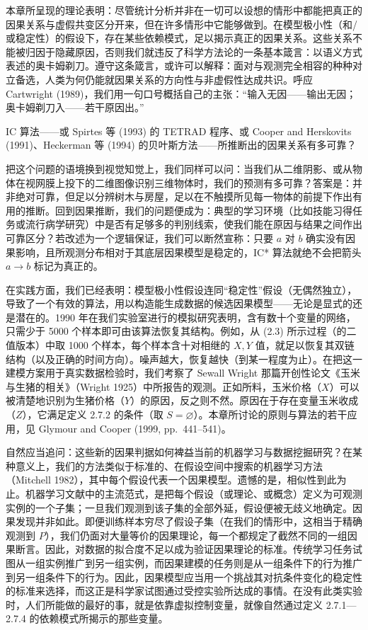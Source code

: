 本章所呈现的理论表明：尽管统计分析并非在一切可以设想的情形中都能把真正的因果关系与虚假共变区分开来，但在许多情形中它能够做到。在模型极小性（和/或稳定性）的假设下，存在某些依赖模式，足以揭示真正的因果关系。这些关系不能被归因于隐藏原因，否则我们就违反了科学方法论的一条基本箴言：以语义方式表述的奥卡姆剃刀。遵守这条箴言，或许可以解释：面对与观测完全相容的种种对立备选，人类为何仍能就因果关系的方向性与非虚假性达成共识。呼应 Cartwright (1989)，我们用一句口号概括自己的主张：“输入无因——输出无因；奥卡姆剃刀入——若干原因出。”

IC 算法——或 Spirtes 等 (1993) 的 TETRAD 程序、或 Cooper and Herskovits (1991)、Heckerman 等 (1994) 的贝叶斯方法——所推断出的因果关系有多可靠？

把这个问题的语境换到视觉知觉上，我们同样可以问：当我们从二维阴影、或从物体在视网膜上投下的二维图像识别三维物体时，我们的预测有多可靠？答案是：并非绝对可靠，但足以分辨树木与房屋，足以在不触摸所见每一物体的前提下作出有用的推断。回到因果推断，我们的问题便成为：典型的学习环境（比如技能习得任务或流行病学研究）中是否有足够多的判别线索，使我们能在原因与结果之间作出可靠区分？若改述为一个逻辑保证，我们可以断然宣称：只要 $a$ 对 $b$ 确实没有因果影响，且所观测分布相对于其底层因果模型是稳定的，IC* 算法就绝不会把箭头 $a\to b$ 标记为真正的。

在实践方面，我们已经表明：模型极小性假设连同“稳定性”假设（无偶然独立），导致了一个有效的算法，用以构造能生成数据的候选因果模型——无论是显式的还是潜在的。1990 年在我们实验室进行的模拟研究表明，含有数十个变量的网络，只需少于 5000 个样本即可由该算法恢复其结构。例如，从 \textup{(2.3)} 所示过程（的二值版本）中取 1000 个样本，每个样本含十对相继的 $X,Y$ 值，就足以恢复其双链结构（以及正确的时间方向）。噪声越大，恢复越快（到某一程度为止）。在把这一建模方案用于真实数据检验时，我们考察了 Sewall Wright 那篇开创性论文《玉米与生猪的相关》（Wright 1925）中所报告的观测。正如所料，玉米价格（$X$）可以被清楚地识别为生猪价格（$Y$）的原因，反之则不然。原因在于存在变量玉米收成（$Z$），它满足定义 2.7.2 的条件（取 $S=\varnothing$）。本章所讨论的原则与算法的若干应用，见 Glymour and Cooper (1999, pp.~441--541)。

自然应当追问：这些新的因果判据如何裨益当前的机器学习与数据挖掘研究？在某种意义上，我们的方法类似于标准的、在假设空间中搜索的机器学习方法（Mitchell 1982），其中每个假设代表一个因果模型。遗憾的是，相似性到此为止。机器学习文献中的主流范式，是把每个假设（或理论、或概念）定义为可观测实例的一个子集；一旦我们观测到该子集的全部外延，假设便被无歧义地确定。因果发现并非如此。即便训练样本穷尽了假设子集（在我们的情形中，这相当于精确观测到 $P$），我们仍面对大量等价的因果理论，每一个都规定了截然不同的一组因果断言。因此，对数据的拟合度不足以成为验证因果理论的标准。传统学习任务试图从一组实例推广到另一组实例，而因果建模的任务则是从一组条件下的行为推广到另一组条件下的行为。因此，因果模型应当用一个挑战其对抗条件变化的稳定性的标准来选择，而这正是科学家试图通过受控实验所达成的事情。在没有此类实验时，人们所能做的最好的事，就是依靠虚拟控制变量，就像自然通过定义 2.7.1—2.7.4 的依赖模式所揭示的那些变量。

